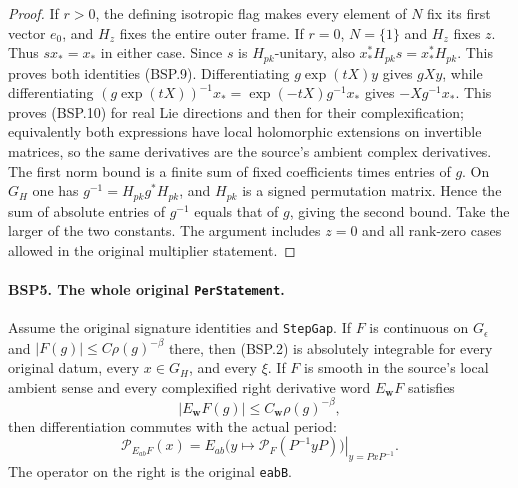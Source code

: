 \begin{proof}
If $r>0$, the defining isotropic flag makes every element of $N$ fix
its first vector $e_0$, and $H_z$ fixes the entire outer frame.
If $r=0$, $N=\{1\}$ and $H_z$ fixes $z$.  Thus $sx_*=x_*$ in either
case.  Since $s$ is $H_{pk}$-unitary, also
$x_*^*H_{pk}s=x_*^*H_{pk}$.  This proves both identities (BSP.9).
Differentiating $g\exp(tX)y$ gives $gXy$, while differentiating
$(g\exp(tX))^{-1}x_*=\exp(-tX)g^{-1}x_*$ gives
$-Xg^{-1}x_*$.  This proves (BSP.10) for real Lie directions and then
for their complexification; equivalently both expressions have local
holomorphic extensions on invertible matrices, so the same derivatives
are the source's ambient complex derivatives.
The first norm bound is a finite sum of fixed coefficients times entries
of $g$.  On $G_H$ one has $g^{-1}=H_{pk}g^*H_{pk}$, and $H_{pk}$ is
a signed permutation matrix.  Hence the sum of absolute entries of
$g^{-1}$ equals that of $g$, giving the second bound.  Take the larger
of the two constants.  The argument includes $z=0$ and all rank-zero
cases allowed in the original multiplier statement.
\end{proof}

\paragraph{BSP5. The whole original \texttt{PerStatement}.}
\label{claim:BSP5}
Assume the original signature identities and \texttt{StepGap}.
If $F$ is continuous on $G_\epsilon$ and
$|F(g)|\le C\rho(g)^{-\beta}$ there, then (BSP.2) is absolutely
integrable for every original datum, every $x\in G_H$, and every $\xi$.
If $F$ is smooth in the source's local ambient sense and every
complexified right derivative word $E_{\mathbf w}F$ satisfies
\[
 |E_{\mathbf w}F(g)|\le C_{\mathbf w}\rho(g)^{-\beta},
 \tag{BSP.11}
\]
then differentiation commutes with the actual period:
\[
 \mathcal P_{E_{ab}F}(x)
    =\left.
       E_{ab}\bigl(y\longmapsto\mathcal P_F(P^{-1}yP)\bigr)
      \right|_{y=PxP^{-1}}.
 \tag{BSP.12}
\]
The operator on the right is the original \texttt{eabB}.

